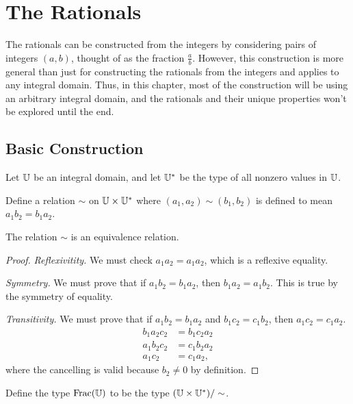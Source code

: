 \documentclass[../../math.tex]{subfiles}
\begin{document}
\setcounter{chapter}{7}

\chapter{The Rationals}

The rationals can be constructed from the integers by considering pairs of
integers $(a, b)$, thought of as the fraction $\frac{a}{b}$.  However, this
construction is more general than just for constructing the rationals from the
integers and applies to any integral domain.  Thus, in this chapter, most of the
construction will be using an arbitrary integral domain, and the rationals and
their unique properties won't be explored until the end.

\section{Basic Construction}

Let $\mathbb{U}$ be an integral domain, and let $\mathbb{U}^*$ be the type of all nonzero values
in $\mathbb{U}$.

\begin{definition}
    Define a relation $\sim$ on $\mathbb{U} \times \mathbb{U}^*$ where $(a_1, a_2) \sim (b_1,
    b_2)$ is defined to mean $a_1b_2 = b_1a_2$.
\end{definition}

\begin{lemma}
    The relation $\sim$ is an equivalence relation.
\end{lemma}
\begin{proof}
    \textit{Reflexivitity.}  We must check $a_1a_2 = a_1a_2$, which is a
    reflexive equality.

    \textit{Symmetry.}  We must prove that if $a_1b_2 = b_1a_2$, then $b_1a_2 =
    a_1b_2$.  This is true by the symmetry of equality.

    \textit{Transitivity.}  We must prove that if $a_1b_2 = b_1a_2$ and
    $b_1c_2 = c_1b_2$, then $a_1c_2 = c_1a_2$.
    \begin{align*}
        b_1a_2c_2 &= b_1c_2a_2 \\
        a_1b_2c_2 &= c_1b_2a_2 \\
        a_1c_2 &= c_1a_2,
    \end{align*}
    where the cancelling is valid because $b_2 \neq 0$ by definition.
\end{proof}

\begin{definition}
    Define the type $\operatorname{Frac}(\mathbb{U})$ to be the type $(\mathbb{U} \times \mathbb{U}^*)/\sim$.
\end{definition}
\end{document}
